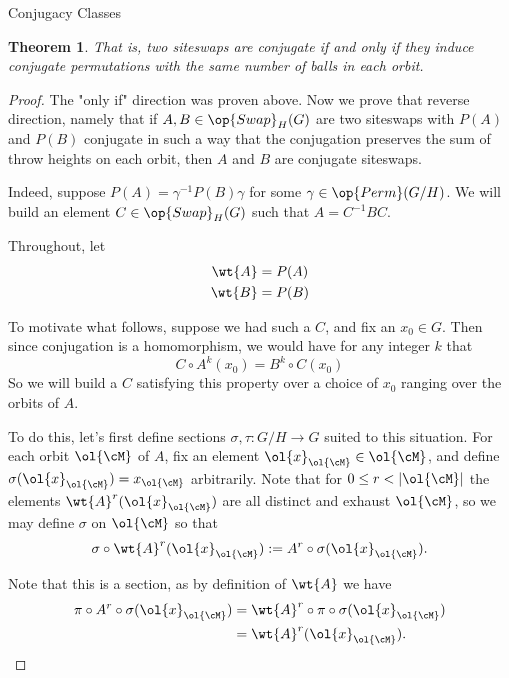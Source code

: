 \documentclass[12nt]{article}
\theoremstyle{plain}
\newtheorem{theorem}{Theorem}
\begin{document}
\begin{subsection}{Conjugacy Classes}
\begin{theorem}
		That is, two siteswaps are conjugate if and only if they induce conjugate permutations with the same number of balls in each orbit.
	\end{theorem}

	\begin{proof}
		The "only if" direction was proven above. Now we prove that reverse direction, namely that if $A, B \in \op{Swap}_H(G)$ are two siteswaps with $P(A)$ and $P(B)$ conjugate in such a way that the conjugation preserves the sum of throw heights on each orbit, then $A$ and $B$ are conjugate siteswaps. 

Indeed, suppose $P(A) = \gamma^{-1}P(B)\gamma$ for some $\gamma \in \op{Perm}(G/H)$. We will build an element $C \in \op{Swap}_H(G)$ such that $A = C^{-1}BC$. 

Throughout, let 
\begin{align*}
	\wt{A} &= P(A) \\
	\wt{B} &= P(B)
\end{align*}

To motivate what follows, suppose we had such a $C$, and fix an $x_0 \in G$. Then since conjugation is a homomorphism, we would have for any integer $k$ that
\[
	C \circ A^k(x_0) = B^k \circ C(x_0)
\]
So we will build a $C$ satisfying this property over a choice of $x_0$ ranging over the orbits of $A$.

To do this, let's first define sections $\sigma, \tau: G/H \to G$ suited to this situation. For each orbit $\ol{\cM}$ of $A$, fix an element $\ol{x}_{\ol{\cM}} \in \ol{\cM}$, and define $\sigma(\ol{x}_{\ol{\cM}} ) = x_{\ol{\cM}}$ arbitrarily. Note that for $0 \leq r < |\ol{\cM}|$ the elements $\wt{A}^r(\ol{x}_{\ol{\cM}})$ are all distinct and exhaust $\ol{\cM}$, so we may define $\sigma$ on $\ol{\cM}$ so that
\[
	\sigma \circ \wt{A}^r(\ol{x}_{\ol{\cM}}) := A^r \circ \sigma(\ol{x}_{\ol{\cM}}).
\] 

Note that this is a section, as by definition of $\wt{A}$ we have
\begin{align*}
	\pi \circ A^r \circ \sigma(\ol{x}_{\ol{\cM}}) &= \wt{A}^r \circ \pi \circ \sigma(\ol{x}_{\ol{\cM}}) \\
	&= \wt{A}^r(\ol{x}_{\ol{\cM}}).
\end{align*}


\end{proof}
\end{subsection}
\end{document}
